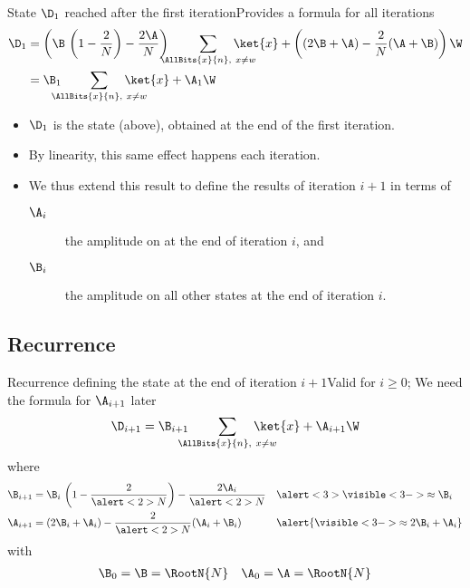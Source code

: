 \begin{Grover}
\begin{frame}{State $\D_{1}$ reached after the first iteration}{Provides a formula for all iterations}
\begin{align*}
\D_{1} &=  \left(\B\,\left(1-\frac{2}{N}\right)-\frac{2\A}{N}\right)\hbox to -1em{\hss}\sum_{\AllBits{x}{n},\ x\neq w} \hbox to -2em{\hss}\ket{x} + \left((2\B+\A)-\frac{2}{N}(\A+\B)\right)\W \\
&= \B_{1} \hbox to -1em{\hss}\sum_{\AllBits{x}{n},\ x\neq w} \hbox to -2em{\hss}\ket{x} + \A_{1} \W
\end{align*}
\begin{itemize}
  \item $\D_{1}$ is the state (above), obtained at the end of the first iteration.
  \item By linearity, this same effect happens each iteration.
  \item We thus extend this result to define the results of iteration $i+1$ in terms of
  \begin{description}
     \item[$\A_{i}$] the amplitude on \W{} at the end of iteration $i$, and
     \item[$\B_{i}$] the amplitude on all other states at the end of iteration $i$.
  \end{description}
\end{itemize}
\end{frame}

\subsection*{Recurrence}

\begin{frame}{Recurrence defining the state at the end of iteration $i+1$}{Valid for $i\geq 0$;  We need the formula for $\A_{i+1}$ later}
\Vskip{-3em}\[ \D_{i+1} = \B_{i+1} \hbox to -1em{\hss}\sum_{\AllBits{x}{n},\ x\neq w} \hbox to -2em{\hss}\ket{x} + \A_{i+1} \W\]
where 
\begin{align*}
    \B_{i+1} &= \B_{i}\,\left(1-\frac{2}{\alert<2>{N}}\right)-\frac{2\A_{i}}{\alert<2>{N}} && \alert<3>{\visible<3->{\approx \B_{i}}} \\
    \A_{i+1} &= (2\B_{i}+\A_{i})-\frac{2}{\alert<2>{N}}(\A_{i}+\B_{i}) && \alert{\visible<3->{\approx 2\B_{i}+\A_{i}}}
\end{align*}
with
\Vskip{-3em}\begin{align*}
    \B_{0} = \B =\RootN{N} &&
    \A_{0} = \A =\RootN{N}
\end{align*}
\end{frame}




\end{Grover}
